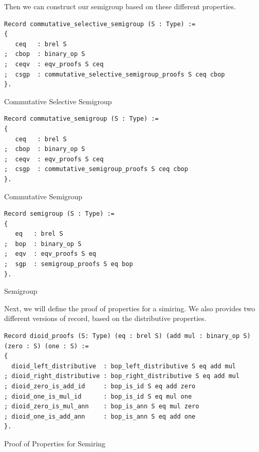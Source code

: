 \documentclass[a4paper,12pt,twoside,openright]{report}
\begin{document}
Then we can construct our semigroup based on these different properties.
\begin{listing}[H]
\begin{verbatim}
Record commutative_selective_semigroup (S : Type) :=
{
   ceq   : brel S      
;  cbop  : binary_op S
;  ceqv  : eqv_proofs S ceq               
;  csgp  : commutative_selective_semigroup_proofs S ceq cbop
}.
\end{verbatim}
\caption{Commutative Selective Semigroup} 
\label{coq:def:commutative_selective_semigroup}
\end{listing}

\begin{listing}[H]
\begin{verbatim}
Record commutative_semigroup (S : Type) :=
{
   ceq   : brel S      
;  cbop  : binary_op S
;  ceqv  : eqv_proofs S ceq               
;  csgp  : commutative_semigroup_proofs S ceq cbop
}.
\end{verbatim}
\caption{Commutative Semigroup} 
\label{coq:def:commutative_semigroup}
\end{listing}

\begin{listing}[H]
\begin{verbatim}
Record semigroup (S : Type) :=
{
   eq   : brel S      
;  bop  : binary_op S
;  eqv  : eqv_proofs S eq               
;  sgp  : semigroup_proofs S eq bop
}.
\end{verbatim}
\caption{Semigroup} 
\label{coq:def:semigroup}
\end{listing}

Next, we will define the proof of properties for a simiring. We also provides two different versions of record, based on the distributive properties.

\begin{listing}[H]
\begin{verbatim}
Record dioid_proofs (S: Type) (eq : brel S) (add mul : binary_op S) (zero : S) (one : S) :=
{  
  dioid_left_distributive  : bop_left_distributive S eq add mul
; dioid_right_distributive : bop_right_distributive S eq add mul
; dioid_zero_is_add_id     : bop_is_id S eq add zero
; dioid_one_is_mul_id      : bop_is_id S eq mul one                                                      
; dioid_zero_is_mul_ann    : bop_is_ann S eq mul zero
; dioid_one_is_add_ann     : bop_is_ann S eq add one
}.
\end{verbatim}
\caption{Proof of Properties for Semiring} 
\label{coq:def:dioid_proofs}
\end{listing}
\end{document}
